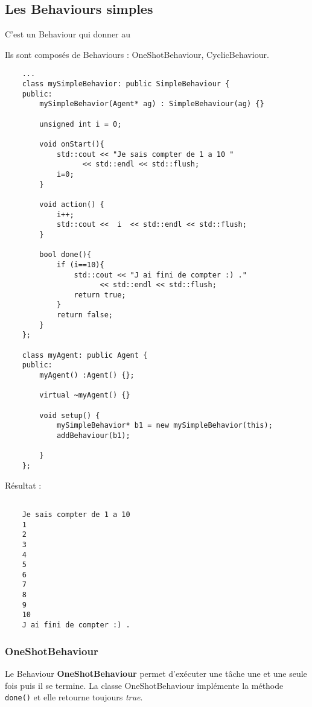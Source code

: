 \subsection{Les Behaviours simples}

C'est un Behaviour qui donner au 

Ils sont composés de  Behaviours : OneShotBehaviour, CyclicBehaviour.

\begin{lstlisting}
	...
	class mySimpleBehavior: public SimpleBehaviour {
	public:
		mySimpleBehavior(Agent* ag) : SimpleBehaviour(ag) {}

		unsigned int i = 0;

		void onStart(){
			std::cout << "Je sais compter de 1 a 10 " 
				  << std::endl << std::flush;
			i=0;
		}

		void action() {
			i++;
			std::cout <<  i  << std::endl << std::flush;
		}

		bool done(){
			if (i==10){
				std::cout << "J ai fini de compter :) ." 
					  << std::endl << std::flush;
				return true;
			}
			return false;
		}
	};

	class myAgent: public Agent {
	public:
		myAgent() :Agent() {};

		virtual ~myAgent() {}

		void setup() {
			mySimpleBehavior* b1 = new mySimpleBehavior(this);
			addBehaviour(b1);

		}
	};

\end{lstlisting}



Résultat : 

\begin{lstlisting}[backgroundcolor=\color{green!5}]

	Je sais compter de 1 a 10 
	1
	2
	3
	4
	5
	6
	7
	8
	9
	10
	J ai fini de compter :) .

\end{lstlisting}


\subsubsection{OneShotBehaviour}

Le Behaviour \textbf{OneShotBehaviour} permet d'exécuter une tâche une et une seule fois puis il se termine. La classe 
OneShotBehaviour implémente la méthode \texttt{done()} et elle retourne toujours \textit{true}.

